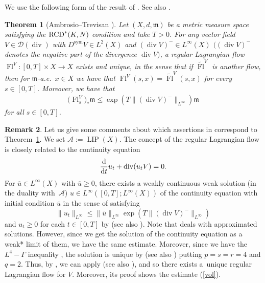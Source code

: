 \documentclass[10pt,a4paper]{amsart}
\numberwithin{equation}{section}
\newtheorem{Thm}{Theorem}[section]
\theoremstyle{definition}
\newtheorem{Rem}[Thm]{Remark}
\newcommand{\LIP}{\operatorname{LIP}}
\newcommand{\sym}{\operatorname{sym}}
\newcommand{\Fl}{\operatorname{Fl}}
\newcommand{\mf}{\mathfrak{m}}
\newcommand{\Div}{\operatorname{div}}
\newcommand{\RCD}{{\rm RCD}^\ast}
\newcommand{\A}{\mathcal{A}}
\begin{document}
We use the following form of the result of \cite{AT1}. See also \cite{AT2}.
\begin{Thm}[Ambrosio--Trevisan \cite{AT1}]\label{RLF}
Let $(X,d,\mf)$ be a metric measure space satisfying the $\RCD(K,N)$ condition and take $T>0$.
For any vector field $V\in\mathcal{D}(\Div)$ with $D^{\sym}V\in L^2(X)$ and $(\Div V)^{-}\in L^\infty (X)$ $((\Div V)^{-}$ denotes the negative part of the divergence $\Div V)$, a regular Lagrangian flow $\Fl^V \colon [0,T]\times X\to X$ exists and unique, in the sense that if $\widetilde{\Fl}^V$ is another flow, then for $\mf$-a.e.\ $x\in X$ we have that $\Fl^V(s,x)=\widetilde{\Fl}^V(s,x)$ for every $s\in[0,T]$.
Moreover, we have that
\begin{gather}\label{vol}
\big(\Fl^V_s\big)_\ast\mf\leq \exp(T\|(\Div V)^-\|_{L^\infty})\mf
\end{gather}
for all $s\in [0,T]$.
\end{Thm}
\begin{Rem}
Let us give some comments about which assertions in \cite{AT1} correspond to Theorem~\ref{RLF}.
We set $\A:=\LIP(X)$.
The concept of the regular Lagrangian flow is closely related to the continuity equation
\[
\frac{\rm d}{{\rm d}t} u_t+\Div(u_t V)=0.
\]
For $\overline{u}\in L^\infty(X)$ with $\overline{u}\geq 0$, there exists a weakly continuous weak solution (in the duality with~$\A$) $u\in L^\infty([0,T]; L^\infty(X))$ of the continuity equation with initial condition $\overline{u}$ in the sense of \cite[Definition~4.2]{AT1} satisfying
\[
\|u_t\|_{L^\infty}\leq \|\overline{u}\|_{L^\infty}\exp(T\|(\Div V)^{-}\|_{L^\infty})
\]
and $u_t\geq 0$ for each $t\in [0,T]$ by \cite[Theorems~4.3 and~4.6]{AT1} (see also \cite[Theorem~6.1]{AT2}).
Note that \cite[Theorem~4.6]{AT1} deals with approximated solutions.
However, since we get the solution of the continuity equation as a weak* limit of them, we have the same estimate.
Moreover, since we have the $L^4-\Gamma$ inequality \cite[Definition~5.1 and~Corollary~6.3]{AT1}, the solution is unique by \cite[Theorem~5.4]{AT1} (see also \cite[Theorem~6.4]{AT2}) putting $p=s=r=4$ and $q=2$.
Thus, by \cite[Theorem~9.2]{AT1}, we can apply \cite[Theorem~7.7]{AT2} (see also \cite[Theorem~8.3]{AT1}), and so there exists a~unique regular Lagrangian flow for $V$.
Moreover, its proof shows the estimate (\ref{vol}).
\end{Rem}
\end{document}
